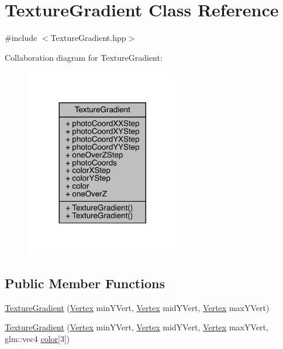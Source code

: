 \hypertarget{class_texture_gradient}{}\section{Texture\+Gradient Class Reference}
\label{class_texture_gradient}


{\ttfamily \#include $<$Texture\+Gradient.\+hpp$>$}



Collaboration diagram for Texture\+Gradient\+:\nopagebreak
\begin{figure}[H]
\begin{center}
\leavevmode
\includegraphics[width=191pt]{class_texture_gradient__coll__graph}
\end{center}
\end{figure}
\subsection*{Public Member Functions}
\begin{DoxyCompactItemize}
\item 
\hyperlink{class_texture_gradient_ac52b7944976524744bcc35ec9918b09c}{Texture\+Gradient} (\hyperlink{struct_vertex}{Vertex} min\+Y\+Vert, \hyperlink{struct_vertex}{Vertex} mid\+Y\+Vert, \hyperlink{struct_vertex}{Vertex} max\+Y\+Vert)
\item 
\hyperlink{class_texture_gradient_a1aac43bd7935b57410122be0affa0896}{Texture\+Gradient} (\hyperlink{struct_vertex}{Vertex} min\+Y\+Vert, \hyperlink{struct_vertex}{Vertex} mid\+Y\+Vert, \hyperlink{struct_vertex}{Vertex} max\+Y\+Vert, glm\+::vec4 \hyperlink{class_texture_gradient_aad5614bae7a7361a1b82b69d9b082ea6}{color}\mbox{[}3\mbox{]})
\end{DoxyCompactItemize}
